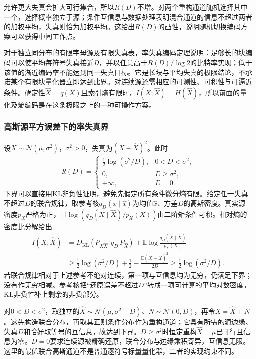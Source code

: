 允许更大失真会扩大可行集合，所以\(R(D)\)不增。对两个重构通道随机选择其中一个，选择概率独立于源；条件互信息与数据处理表明混合通道的信息不超过两者的加权平均，失真则恰为加权平均。这给出\(R(D)\)的凸性，说明随机切换编码方案可以获得中间工作点。

对于独立同分布的有限字母源及有限失真表，率失真编码定理说明：足够长的块编码可以使平均每符号失真接近\(D\)，并以任意高于\(R(D)/\log2\)的比特率实现；低于该值的渐近编码率不能达到同一失真目标。它是长块与平均失真的极限结论，不承诺某个有限块量化器立即达到此界。对连续源还需相应的可测性、可积性与可逼近条件。确定性\(\widehat X=q(X)\)且索引熵有限时，\(I(X;\widehat X)=H(\widehat X)\)，所以前面的量化及熵编码是在这条极限之上的一种可操作方案。

\subsubsection{高斯源平方误差下的率失真界}
设\(X\sim\mathcal N(\mu,\sigma^2)\)，\(\sigma^2>0\)，失真为\((X-\widehat X)^2\)。此时
\begin{equation}
 R(D)=
 \begin{cases}
 \tfrac12\log(\sigma^2/D),&0<D<\sigma^2,\\
 0,&D\geq\sigma^2,\\
 +\infty,&D=0.
 \end{cases}
 \label{eq:information-gaussian-rate-distortion}
\end{equation}
下界可以直接用KL非负性证明，避免先假定所有条件微分熵有限。给定任一失真不超过\(D\)的联合规律，取参考核\(q_D(x\mid\widehat x)\)为均值\(\widehat x\)、方差\(D\)的高斯密度。真实源密度\(p_X\)严格为正，且\(\log(q_D(X\mid\widehat X)/p_X(X))\)由二阶矩条件可积。相对熵的密度比分解给出
\[
\begin{aligned}
 I(X;\widehat X)
 &=D_{\mathrm{KL}}(P_{X\widehat X}\Vert q_D\,P_{\widehat X})
   +\mathbb E\log\frac{q_D(X\mid\widehat X)}{p_X(X)}\\
 &\geq\frac12\log(\sigma^2/D)+\frac12
       -\frac{\mathbb E(X-\widehat X)^2}{2D}
 \geq\frac12\log(\sigma^2/D).
\end{aligned}
\]
若联合规律相对于上述参考不绝对连续，第一项与互信息均为无穷，仍满足下界；没有作无穷相减。参考核把“还原误差不超过\(D\)”转成一项可计算的平均对数密度，KL非负性补上剩余的非负部分。

对\(0<D<\sigma^2\)，取独立的\(\widehat X\sim\mathcal N(\mu,\sigma^2-D)\)、\(N\sim\mathcal N(0,D)\)，再令\(X=\widehat X+N\)。这先构造联合分布，再取其正则条件分布作为重构通道；它具有所需的源边缘、失真\(D\)和恰好取等号的互信息，故达到下界。\(D\geq\sigma^2\)时恒定重构\(\widehat X=\mu\)已可行且信息为零。\(D=0\)要求连续源被精确还原，联合分布与边缘乘积奇异，互信息无限。这里的最优联合高斯通道不是普通逐符号标量量化器，二者的实现约束不同。

